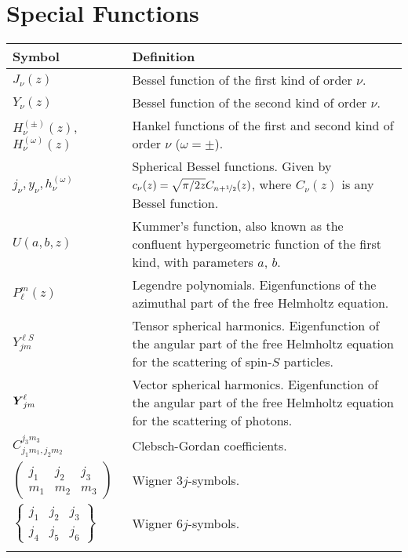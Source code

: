 \section*{Special Functions}
\begin{tabularx}{\textwidth}{lX}
  \hline\hline
  Symbol			& Definition	\\
  \hline\hline
  $J_\nu(z)$		& Bessel function of the first kind of order $\nu$.	\\
  $Y_\nu(z)$		& Bessel function of the second kind of order $\nu$.	\\
  $H_\nu^{(\pm)}(z)$, %
  $H_\nu^{(\omega)}(z)$& Hankel functions of the first and second kind of order $\nu$ ($\omega=\pm$).\\
  $j_\nu,y_\nu,h^{(\omega)}_\nu$	
  					& Spherical Bessel functions. Given by $c_\nu(z)=\sqrt{\pi/2z}C_{n+\nicefrac{1}{2}}(z)$, where $C_\nu(z)$ is any Bessel function. \\
  $U(a,b,z)$		& Kummer's function, also known as the confluent hypergeometric function of the first kind, with parameters $a$, $b$. \\
  $P_\ell^m(z)$		& Legendre polynomials. Eigenfunctions of the azimuthal part of the free Helmholtz equation.\\
  $Y_{jm}^{\ell S}$	
  					& Tensor spherical harmonics. Eigenfunction of the angular part of the free Helmholtz equation for the scattering of spin-$S$ particles.\\
  $\boldsymbol{Y}^{\ell}_{jm}$
  					& Vector spherical harmonics. Eigenfunction of the angular part of the free Helmholtz equation for the scattering of 
  						photons.\\
  $C_{j_1m_1,j_2m_2}^{j_3m_3}$ 
  					& Clebsch-Gordan coefficients.	\\
  $\begin{pmatrix} j_1 & j_2 & j_3 \\ m_1 & m_2 & m_3 \end{pmatrix}$
  					& Wigner $3j$-symbols.	\\
  $\begin{Bmatrix} j_1 & j_2 & j_3 \\ j_4 & j_5 & j_6\end{Bmatrix}$ 
  					& Wigner $6j$-symbols.	\\ 
  \hline\hline				\\
\end{tabularx}

